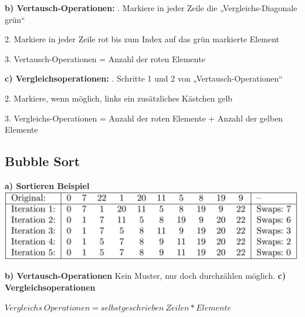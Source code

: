 \documentclass[12pt]{article}
\begin{document}
	\textbf{b) Vertausch-Operationen:} .	Markiere in jeder Zeile die „Vergleichs-Diagonale grün“
	
	2.	Markiere in jeder Zeile rot bis zum Index auf das grün markierte Element
	
	3.	Vertausch-Operationen = Anzahl der roten Elemente\hfill \break
	
	\textbf{c) Vergleichsoperationen:} .	Schritte 1 und 2 von „Vertausch-Operationen“
	
	2.	Markiere, wenn möglich, links ein zusätzliches Kästchen gelb
	
	3.	Vergleichs-Operationen = Anzahl der roten Elemente + Anzahl der gelben Elemente
	
	\newpage
	
	\subsection{Bubble Sort}
	\textbf{a) Sortieren Beispiel}
	\newline\newline
	\includegraphics[scale=0.5]{BubbleSort}
	\newline
	
	\textbf{b) Vertausch-Operationen} \newline
	Kein Muster, nur doch durchzählen möglich. \hfill \break
	\newline
	\textbf{c) Vergleichsoperationen}
	

		\begin{center}
		$Vergleichs \ Operationen = selbst geschrieben \ Zeilen * Elemente$
	\end{center}
	
\end{document}
